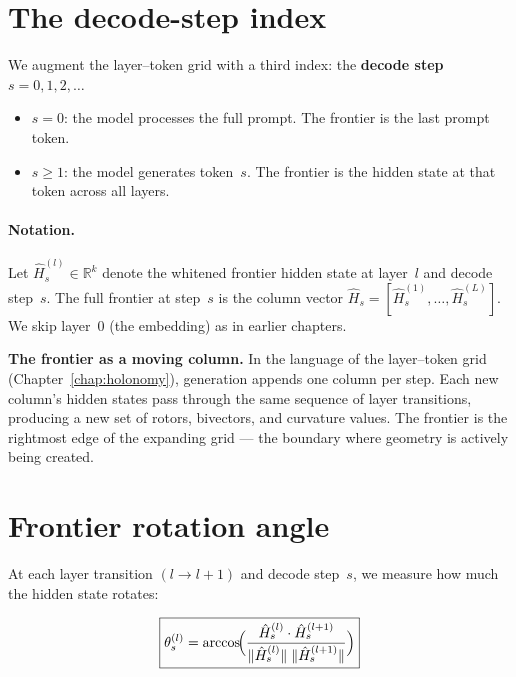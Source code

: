 \documentclass[11pt, twoside, openright]{memoir}
\numberwithin{equation}{chapter}
\begin{document}
\section{The decode-step index}
\label{sec:frontier-index}

We augment the layer--token grid with a third index: the
\textbf{decode step} $s = 0, 1, 2, \ldots$

\begin{itemize}[nosep]
\item $s = 0$: the model processes the full prompt.  The frontier
  is the last prompt token.
\item $s \geq 1$: the model generates token~$s$.  The frontier is
  the hidden state at that token across all layers.
\end{itemize}

\paragraph{Notation.}
Let $\hat{H}^{(l)}_s \in \mathbb{R}^k$ denote the whitened
frontier hidden state at layer~$l$ and decode step~$s$.
The full frontier at step~$s$ is the column vector
$\hat{H}_s = [\hat{H}^{(1)}_s, \ldots, \hat{H}^{(L)}_s]$.
We skip layer~0 (the embedding) as in earlier chapters.

\begin{gabox}
\textbf{The frontier as a moving column.}
In the language of the layer--token grid (Chapter~\ref{chap:holonomy}),
generation appends one column per step.
Each new column's hidden states pass through the same sequence of
layer transitions, producing a new set of rotors, bivectors, and
curvature values.  The frontier is the rightmost edge of the
expanding grid --- the boundary where geometry is actively being
created.
\end{gabox}


\section{Frontier rotation angle}
\label{sec:frontier-angle}

At each layer transition $(l \to l+1)$ and decode step~$s$, we
measure how much the hidden state rotates:

\begin{equation}
  \boxed{%
    \theta^{(l)}_s
    = \arccos\!\Bigl(
        \frac{\hat{H}^{(l)}_s \cdot \hat{H}^{(l+1)}_s}
             {\|\hat{H}^{(l)}_s\|\;\|\hat{H}^{(l+1)}_s\|}
      \Bigr)
  }
\end{equation}
\end{document}
